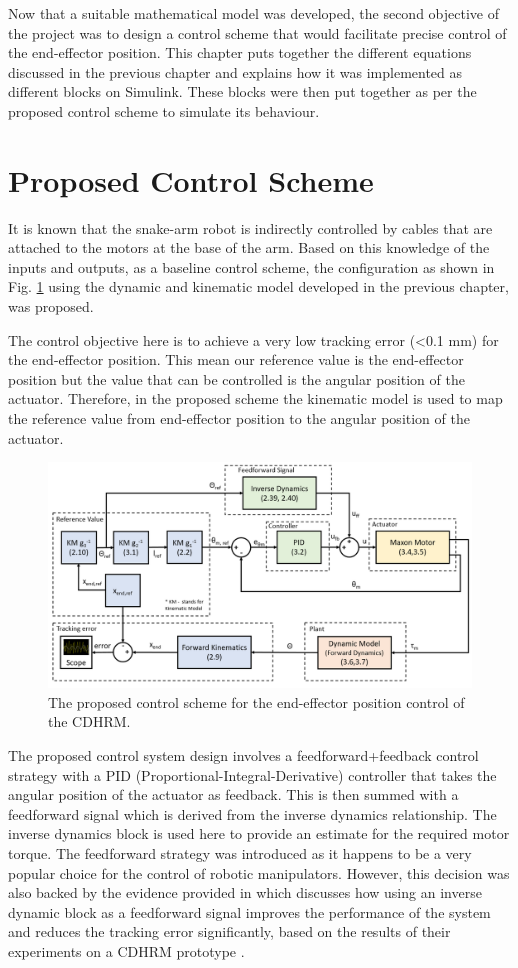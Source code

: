 \documentclass[a4paper,12pt]{report}
\begin{document}
Now that a suitable mathematical model was developed, the second objective of the project was to design a control scheme that would facilitate precise control of the end-effector position. This chapter puts together the different equations discussed in the previous chapter and explains how it was implemented as different blocks on Simulink.  These blocks were then put together as per the proposed control scheme to simulate its behaviour. 

\section{Proposed Control Scheme}

 It is known that the snake-arm robot is indirectly controlled by cables that are attached to the motors at the base of the arm. Based on this knowledge of the inputs and outputs, as a baseline control scheme, the configuration as shown in Fig. \ref{proposed-control-scheme} using the dynamic and kinematic model developed in the previous chapter, was proposed. 
 
 The control objective here is to achieve a very low tracking error (<0.1 mm) for the end-effector position. This mean our reference value is the end-effector position but the value that can be controlled is the angular position of the actuator. Therefore, in the proposed scheme the kinematic model is used to map the reference value from end-effector position to the angular position of the actuator.
 \begin{figure}[H]
 	\includegraphics[width=\textwidth]{images/control scheme.png}
 	\caption{The proposed control scheme for the end-effector position control of the CDHRM.}
 	\label{proposed-control-scheme}
 \end{figure}
 The proposed control system design involves a feedforward+feedback control strategy with a PID (Proportional-Integral-Derivative) controller that takes the angular position of the actuator as feedback. This is then summed with a feedforward signal which is derived from the inverse dynamics relationship. The inverse dynamics block is used here to provide an estimate for the required motor torque. The feedforward strategy was introduced as it happens to be a very popular choice for the control of robotic manipulators. However, this decision was also backed by the evidence provided in \cite{RN30} which discusses how using an inverse dynamic block as a feedforward signal improves the performance of the system and reduces the tracking error significantly, based on the results of their experiments on a CDHRM prototype . 
\end{document}
